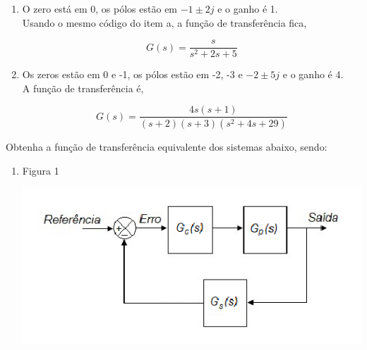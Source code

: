 \documentclass[a4paper, 10pt]{article}
\begin{document}
\begin{list}{\textbf{Questão .}}{
\setlength{\labelwidth}{-2mm} \setlength{\parsep}{0mm}
\setlength{\topsep}{0mm} \setlength{\leftmargin}{0mm}}
\begin{enumerate}
                Para a solução, o seguinte código foi utilizado,

                \begin{lstlisting}
z = [];
p = [-2+5j -2-5j];
k = 10;
zpk(z, p, k);               
                \end{lstlisting}

                Resultando na seguinte função de transferência,

                $$
                G(s) = \frac{10}{s^2 + 4 s + 29}
                $$



             \item
                 O zero está em 0, os pólos estão em $-1\pm2j$ e o ganho é 1.\\

                 Usando o mesmo código do item a, a função de transferência fica,

                 $$
                 G(s) = \frac{s}{s^2 + 2 s + 5}
                 $$

                 

             \item
                 Os zeros estão em 0 e -1, os pólos estão em -2, -3 e 
                 $-2\pm5j$ e o ganho é 4.\\

                 A função de transferência é,

                 $$
                 G(s) = \frac{4 s (s+1)}{(s+2) (s+3) (s^2 + 4 s + 29)}
                 $$
                

        \end{enumerate}



\newpage
\item
    Obtenha a função de transferência equivalente dos sistemas abaixo, sendo:

    \begin{enumerate}
        \item
            Figura 1
            \begin{center}
            \includegraphics[scale=0.5]{fig5a.png}
            \end{center}


\end{enumerate}
\end{list}
\end{document}
